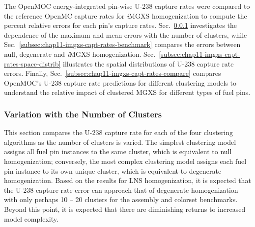 The OpenMOC energy-integrated pin-wise U-238 capture rates were compared to the reference OpenMC capture rates for \textit{i}\ac{MGXS} homogenization to compute the percent relative errors for each pin's capture rates. Sec.~\ref{subsec:chap11-imgxs-capt-rates-num-clusters} investigates the dependence of the maximum and mean errors with the number of clusters, while Sec.~\ref{subsec:chap11-imgxs-capt-rates-benchmark} compares the errors between null, degenerate and \textit{i}\ac{MGXS} homogenization. Sec.~\ref{subsec:chap11-imgxs-capt-rates-space-distrib} illustrates the spatial distributions of U-238 capture rate errors. Finally, Sec.~\ref{subsec:chap11-imgxs-capt-rates-compare} compares OpenMOC's U-238 capture rate predictions for different clustering models to understand the relative impact of clustered \ac{MGXS} for different types of fuel pins.

\subsubsection{Variation with the Number of Clusters}
\label{subsec:chap11-imgxs-capt-rates-num-clusters}

This section compares the U-238 capture rate for each of the four clustering algorithms as the number of clusters is varied. The simplest clustering model assigns all fuel pin instances to the same cluster, which is equivalent to null homogenization; conversely, the most complex clustering model assigns each fuel pin instance to its own unique cluster, which is equivalent to degenerate homogenization. Based on the results for \ac{LNS} homogenization, it is expected that the U-238 capture rate error can approach that of degenerate homogenization with only perhaps 10 -- 20 clusters for the assembly and colorset benchmarks. Beyond this point, it is expected that there are diminishing returns to increased model complexity. 

